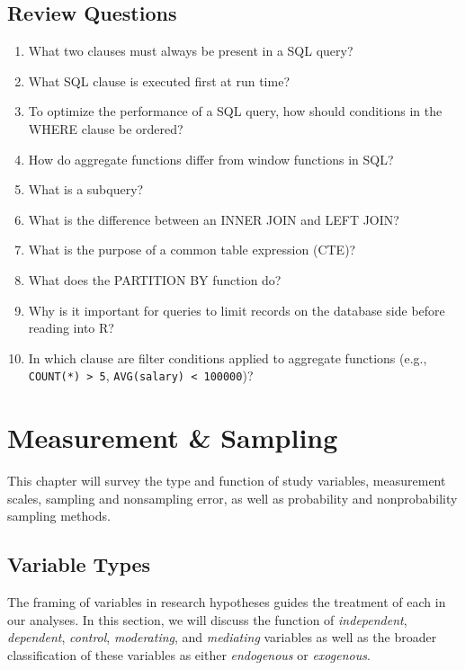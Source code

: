 \documentclass[
]{book}
\begin{document}
\hypertarget{review-questions-1}{%
\section{Review Questions}\label{review-questions-1}}

\begin{enumerate}
\def\labelenumi{\arabic{enumi}.}
\item
  What two clauses must always be present in a SQL query?
\item
  What SQL clause is executed first at run time?
\item
  To optimize the performance of a SQL query, how should conditions in the WHERE clause be ordered?
\item
  How do aggregate functions differ from window functions in SQL?
\item
  What is a subquery?
\item
  What is the difference between an INNER JOIN and LEFT JOIN?
\item
  What is the purpose of a common table expression (CTE)?
\item
  What does the PARTITION BY function do?
\item
  Why is it important for queries to limit records on the database side before reading into R?
\item
  In which clause are filter conditions applied to aggregate functions (e.g., \texttt{COUNT(*)\ \textgreater{}\ 5}, \texttt{AVG(salary)\ \textless{}\ 100000})?
\end{enumerate}

\hypertarget{measure-sampl}{%
\chapter{Measurement \& Sampling}\label{measure-sampl}}

This chapter will survey the type and function of study variables, measurement scales, sampling and nonsampling error, as well as probability and nonprobability sampling methods.

\hypertarget{variable-types}{%
\section{Variable Types}\label{variable-types}}

The framing of variables in research hypotheses guides the treatment of each in our analyses. In this section, we will discuss the function of \emph{independent}, \emph{dependent}, \emph{control}, \emph{moderating}, and \emph{mediating} variables as well as the broader classification of these variables as either \emph{endogenous} or \emph{exogenous}.
\end{document}
